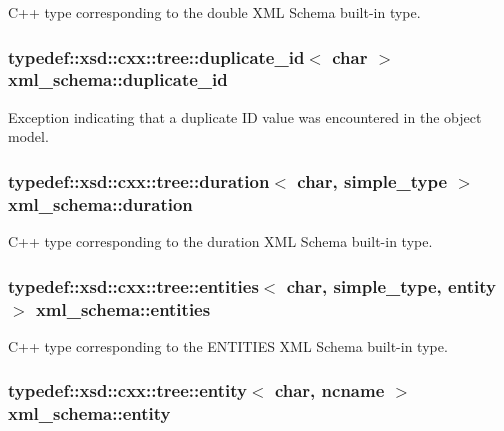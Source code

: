 C++ type corresponding to the double X\-M\-L Schema built-\/in type. 

\hypertarget{namespacexml__schema_a6dc417261c18af4fcce090133dd605f8}{
\subsubsection[{duplicate\-\_\-id}]{\setlength{\rightskip}{0pt plus 5cm}typedef\-::xsd\-::cxx\-::tree\-::duplicate\-\_\-id$<$ char $>$ {\bf xml\-\_\-schema\-::duplicate\-\_\-id}}}\label{namespacexml__schema_a6dc417261c18af4fcce090133dd605f8}


Exception indicating that a duplicate I\-D value was encountered in the object model. 

\hypertarget{namespacexml__schema_a1acfdda85b50d50b1718ab6917a8f993}{
\subsubsection[{duration}]{\setlength{\rightskip}{0pt plus 5cm}typedef\-::xsd\-::cxx\-::tree\-::duration$<$ char, {\bf simple\-\_\-type} $>$ {\bf xml\-\_\-schema\-::duration}}}\label{namespacexml__schema_a1acfdda85b50d50b1718ab6917a8f993}


C++ type corresponding to the duration X\-M\-L Schema built-\/in type. 

\hypertarget{namespacexml__schema_a27645dad916b7c154cfa441c84cfb8f8}{
\subsubsection[{entities}]{\setlength{\rightskip}{0pt plus 5cm}typedef\-::xsd\-::cxx\-::tree\-::entities$<$ char, {\bf simple\-\_\-type}, {\bf entity} $>$ {\bf xml\-\_\-schema\-::entities}}}\label{namespacexml__schema_a27645dad916b7c154cfa441c84cfb8f8}


C++ type corresponding to the E\-N\-T\-I\-T\-I\-E\-S X\-M\-L Schema built-\/in type. 

\hypertarget{namespacexml__schema_acbf59a94b42e0d01cdfc56b93465912a}{
\subsubsection[{entity}]{\setlength{\rightskip}{0pt plus 5cm}typedef\-::xsd\-::cxx\-::tree\-::entity$<$ char, {\bf ncname} $>$ {\bf xml\-\_\-schema\-::entity}}}\label{namespacexml__schema_acbf59a94b42e0d01cdfc56b93465912a}


